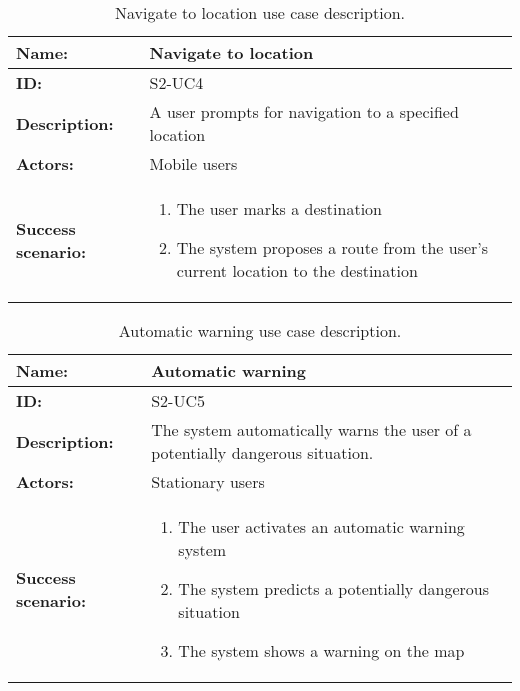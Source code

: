\begin{table}[h!]
    \centering
    \begin{tabularx}{\textwidth}{lX}
        \toprule
        \textbf{Name:}  & Navigate to location \\ \midrule
        \textbf{ID:}    & S2-UC4 \\ \midrule
        \textbf{Description:} & A user prompts for navigation to a specified location \\ \midrule
        \textbf{Actors:} & Mobile users \\ \midrule
        \textbf{Success scenario:} & 
        \begin{enumerate}
            \item The user marks a destination
            \item The system proposes a route from the user's current location to the destination
        \end{enumerate}
        \\ \bottomrule
    \end{tabularx}
    \caption{Navigate to location use case description.}
    \label{tab:s2-uc4}
\end{table}

\begin{table}[h!]
    \centering
    \begin{tabularx}{\textwidth}{lX}
        \toprule
        \textbf{Name:}  & Automatic warning \\ \midrule
        \textbf{ID:}    & S2-UC5 \\ \midrule
        \textbf{Description:} & The system automatically warns the user of a potentially dangerous situation. \\ \midrule
        \textbf{Actors:} & Stationary users \\ \midrule
        \textbf{Success scenario:} & 
        \begin{enumerate}
            \item The user activates an automatic warning system
            \item The system predicts a potentially dangerous situation
            \item The system shows a warning on the map
        \end{enumerate}
        \\ \bottomrule
    \end{tabularx}
    \caption{Automatic warning use case description.}
    \label{tab:s2-uc5}
\end{table}

